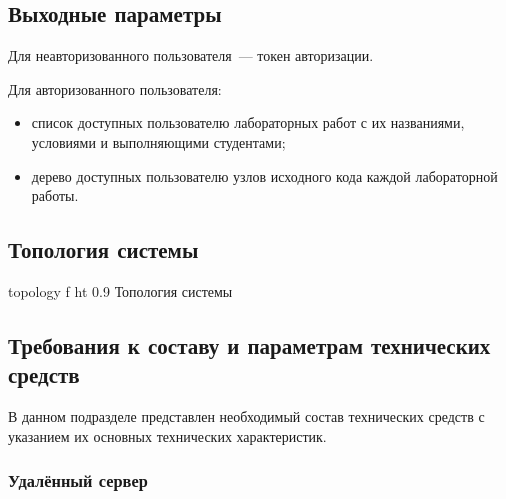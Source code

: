 \documentclass{bmstu}
\begin{document}
  \subsection{Выходные параметры}

  Для неавторизованного пользователя~--- токен авторизации.

  Для авторизованного пользователя:
  \begin{itemize}[label=---]
    \item список доступных пользователю лабораторных работ с их
      названиями, условиями и выполняющими студентами;
    \item дерево доступных пользователю узлов исходного кода каждой
      лабораторной работы.
  \end{itemize}

  \subsection{Топология системы}

    {topology}
    {f}
    {ht}
    {0.9 \textwidth}
    {Топология системы}

  \FloatBarrier

  \subsection{Требования к составу и параметрам технических средств}

  В данном подразделе представлен необходимый состав технических
  средств с указанием их основных технических характеристик.

  \subsubsection{Удалённый сервер}
\end{document}
